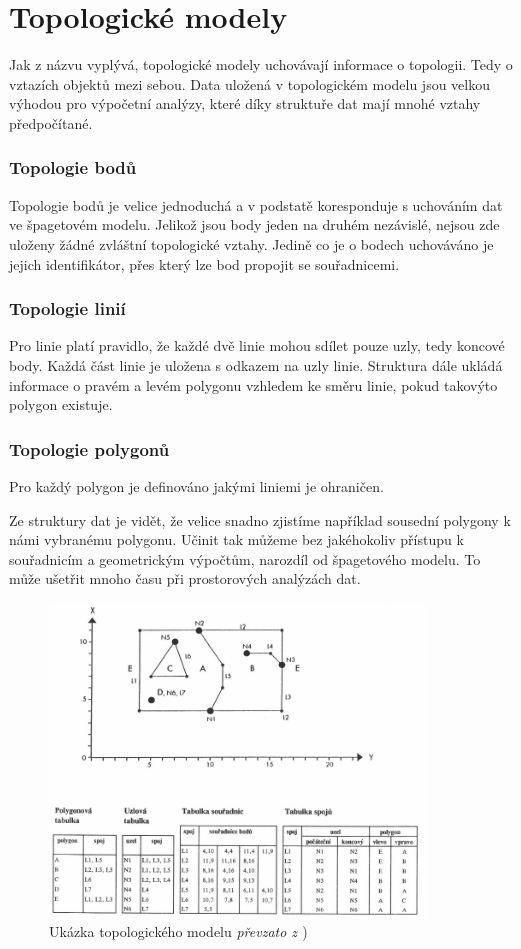\section{Topologické modely}
	Jak z názvu vyplývá, topologické modely uchovávají informace o topologii. Tedy o vztazích objektů mezi sebou. Data uložená v topologickém modelu jsou velkou výhodou pro výpočetní analýzy, které díky struktuře dat mají mnohé vztahy předpočítané.

\subsubsection{Topologie bodů}
	Topologie bodů je velice jednoduchá a v podstatě koresponduje s uchováním dat ve špagetovém modelu. Jelikož jsou body jeden na druhém nezávislé, nejsou zde uloženy žádné zvláštní topologické vztahy. Jedině co je o bodech uchováváno je jejich identifikátor, přes který lze bod propojit se souřadnicemi.
	
\subsubsection{Topologie linií}
	Pro linie platí pravidlo, že každé dvě linie mohou sdílet pouze uzly, tedy koncové body. Každá část linie je uložena s odkazem na uzly linie. Struktura dále ukládá informace o pravém a levém polygonu vzhledem ke směru linie, pokud takovýto polygon existuje.

\subsubsection{Topologie polygonů}
	Pro každý polygon je definováno jakými liniemi je ohraničen. 
	
Ze struktury dat je vidět, že velice snadno zjistíme například sousední polygony k námi vybranému polygonu. Učinit tak můžeme bez jakéhokoliv přístupu k souřadnicím a geometrickým výpočtům, narozdíl od špagetového modelu. To může ušetřit mnoho času při prostorových analýzách dat. \cite{QGIS_software} \cite{tucek1997geograficke} \cite{kolar2003geograficke} \cite{vesely2007thesis}

\begin{figure}[h]
  \centering
  \includegraphics[width=10cm]{./pictures/3/topo_model.png}
  \caption{Ukázka topologického modelu \textit{převzato z \cite{kolar2003geograficke}})}
  \label{fig:3-time_complexity}
\end{figure}
